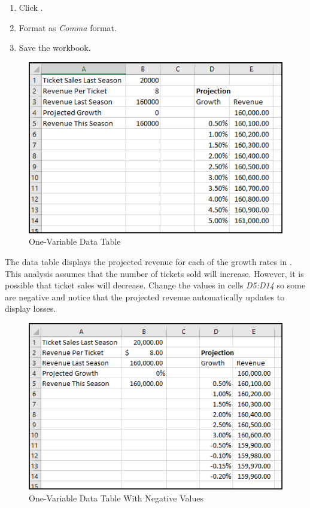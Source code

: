 \begin{enumbox}
\begin{enumerate}
		\item Click .
		\item Format  as \textit{Comma} format.
		\item Save the  workbook.
	\end{enumerate}
\end{enumbox}

\begin{figure}[H]
	\centering
	\includegraphics[width=\maxwidth{.95\linewidth}]{gfx/ch08_fig42}
	\caption{One-Variable Data Table}
	\label{08:fig42}
\end{figure}

The data table displays the projected revenue for each of the growth rates in . This analysis assumes that the number of tickets sold will increase. However, it is possible that ticket sales will decrease. Change the values in cells \textit{D5:D14} so some are negative and notice that the projected revenue automatically updates to display losses.

\begin{figure}[H]
	\centering
	\includegraphics[width=\maxwidth{.95\linewidth}]{gfx/ch08_fig43}
	\caption{One-Variable Data Table With Negative Values}
	\label{08:fig43}
\end{figure}
	
